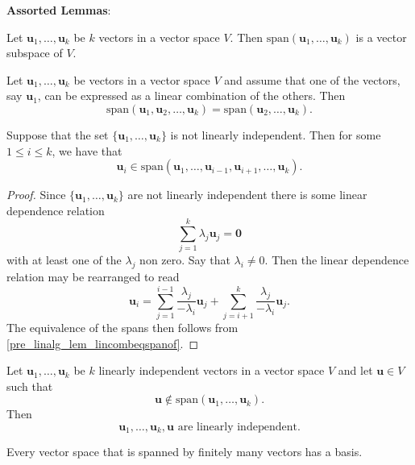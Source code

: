 \documentclass[10pt, a4paper]{article}
\newcommand{\mbf}[1]{\mathbf{#1}}
\begin{document}
\textbf{Assorted Lemmas}:
\begin{lemma}
    Let $\mbf{u}_1, \dotsc, \mbf{u}_k$ be $k$ vectors in a vector space $V$.
    Then $\mathrm{span}(\mbf{u}_1, \dotsc, \mbf{u}_k)$ is a vector subspace of $V$.
\end{lemma}
\begin{lemma}\label{pre_linalg_lem_lincombeqspanof}
    Let $\mbf{u}_1, \dotsc, \mbf{u}_k$ be vectors in a vector space $V$ and assume that one of the vectors,
    say $\mbf{u}_1$,
    can be expressed as a linear combination of the others.
    Then
    \[
    \mathrm{span}(\mbf{u}_1, \mbf{u}_2, \dotsc, \mbf{u}_k) = \mathrm{span}(\mbf{u}_2, \dotsc, \mbf{u}_k).
    \]
\end{lemma}
\begin{lemma}
    Suppose that the set $\{\mbf{u}_1, \dotsc, \mbf{u}_k\}$ is not linearly independent.
    Then for some $1 \leq i \leq k$,
    we have that
    \[
    \mbf{u}_i \in \mathrm{span}(\mbf{u}_1, \dotsc, \mbf{u}_{i - 1}, \mbf{u}_{i + 1}, \dotsc, \mbf{u}_k).
    \]
    \begin{proof}
        Since $\{\mbf{u}_1, \dotsc, \mbf{u}_k\}$ are not linearly independent there is some linear dependence relation
        \[
        \sum_{j = 1}^{k}\lambda_j\mbf{u}_j = \mbf{0}
        \]
        with at least one of the $\lambda_j$ non zero.
        Say that $\lambda_i \neq 0$.
        Then the linear dependence relation may be rearranged to read
        \[
        \mbf{u}_i = \sum_{j = 1}^{i - 1}\frac{\lambda_j}{-\lambda_i}\mbf{u}_j + \sum_{j = i + 1}^{k}\frac{\lambda_j}{-\lambda_i}\mbf{u}_j.
        \]
        The equivalence of the spans then follows from \autoref{pre_linalg_lem_lincombeqspanof}.
    \end{proof}
\end{lemma}

\begin{lemma}
    Let $\mbf{u}_1, \dotsc, \mbf{u}_k$ be $k$ linearly independent vectors in a vector space $V$ and let $\mbf{u} \in V$ such that
    \[
    \mbf{u} \notin \mathrm{span}(\mbf{u}_1, \dotsc, \mbf{u}_k).
    \]
    Then
    \[
    \mbf{u}_1, \dotsc, \mbf{u}_k, \mbf{u}\text{ are linearly independent}.
    \]
\end{lemma}

\begin{theorem}
    Every vector space that is spanned by finitely many vectors has a basis.
\end{theorem}
\end{document}

